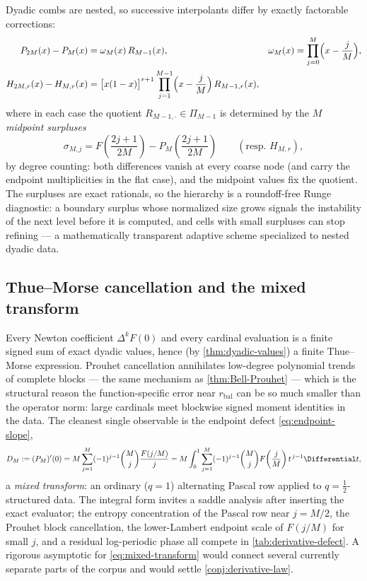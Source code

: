 \documentclass[11pt,oneside]{article}
\numberwithin{equation}{section}
\theoremstyle{definition}
\theoremstyle{remark}
\begin{document}
Dyadic combs are nested, so successive interpolants differ by exactly
factorable corrections:
\begin{align}
 P_{2M}(x)-P_{M}(x)
 &=\omega_M(x)\,R_{M-1}(x),
 &\omega_M(x)&=\prod_{j=0}^{M}\Bigl(x-\frac jM\Bigr),
 \label{eq:nested-ordinary}\\
 H_{2M,r}(x)-H_{M,r}(x)
 &=\bigl[x(1-x)\bigr]^{r+1}
 \prod_{j=1}^{M-1}\Bigl(x-\frac jM\Bigr)\,R_{M-1,r}(x),
 \label{eq:nested-flat}
\end{align}
where in each case the quotient $R_{M-1,\cdot}\in\Pi_{M-1}$ is
determined by the $M$ \emph{midpoint surpluses}
\begin{equation}
 \sigma_{M,j}
 =F\!\left(\frac{2j+1}{2M}\right)
 -P_{M}\!\left(\frac{2j+1}{2M}\right)
 \qquad(\text{resp.\ }H_{M,r}),
 \label{eq:midpoint-surplus}
\end{equation}
by degree counting: both differences vanish at every coarse node (and
carry the endpoint multiplicities in the flat case), and the midpoint
values fix the quotient.  The surpluses are exact rationals, so the
hierarchy is a roundoff-free Runge diagnostic: a boundary surplus
whose normalized size grows signals the instability of the next level
before it is computed, and cells with small surpluses can stop
refining --- a mathematically transparent adaptive scheme specialized
to nested dyadic data.

\subsection{Thue--Morse cancellation and the mixed transform}

Every Newton coefficient $\Delta^{k}F(0)$ and every cardinal
evaluation is a finite signed sum of exact dyadic values, hence (by
\cref{thm:dyadic-values}) a finite Thue--Morse expression.  Prouhet
cancellation annihilates low-degree polynomial trends of complete
blocks --- the same mechanism as \cref{thm:Bell-Prouhet} --- which is
the structural reason the function-specific error near
$r_{\mathrm{bal}}$ can be so much smaller than the operator norm:
large cardinals meet blockwise signed moment identities in the data.
The cleanest single observable is the endpoint defect
\eqref{eq:endpoint-slope},
\begin{equation}
 D_M:=(P_M)'(0)
 =M\sum_{j=1}^{M}(-1)^{j-1}\binom Mj\frac{F(j/M)}{j}
 =M\int_0^1\sum_{j=1}^{M}(-1)^{j-1}\binom Mj
 F\!\left(\frac jM\right)t^{\,j-1}\Differential t,
 \label{eq:mixed-transform}
\end{equation}
a \emph{mixed transform}: an ordinary ($q{=}1$) alternating Pascal row
applied to $q{=}\tfrac12$-structured data.  The integral form invites
a saddle analysis after inserting the exact evaluator; the entropy
concentration of the Pascal row near $j=M/2$, the Prouhet block
cancellation, the lower-Lambert endpoint scale of $F(j/M)$ for small
$j$, and a residual log-periodic phase all compete in
\cref{tab:derivative-defect}.  A rigorous asymptotic for
\eqref{eq:mixed-transform} would connect several currently separate
parts of the corpus and would settle
\cref{conj:derivative-law}.
\end{document}
